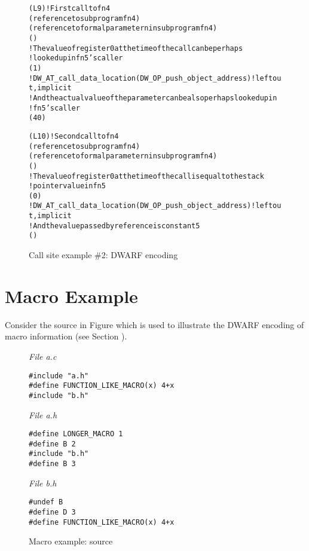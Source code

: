 \begin{figure}[ht]
\begin{dwflisting}
\begin{alltt}

\DWTAGcallsite
    \DWATcallreturnpc(L9)                       ! First call to fn4
    \DWATcallorigin(reference to subprogram fn4)
    \DWTAGcallsiteparameter
        \DWATcallparameter(reference to formal parameter n in subprogram fn4)
        \DWATlocation(\DWOPregzero)
        ! The value of register 0 at the time of the call can be perhaps 
        !   looked up in fn5's caller
        \DWATcallvalue(\DWOPentryvalue{} 1 \DWOPregzero)
        ! DW_AT_call_data_location(DW_OP_push_object_address) ! left out, implicit
        ! And the actual value of the parameter can be also perhaps looked up in
        ! fn5's caller
        \DWATcalldatavalue(\DWOPentryvalue{} 4 \DWOPbregzero{} 0 )
        
\DWTAGcallsite
    \DWATcallreturnpc(L10)                      ! Second call to fn4
    \DWATcallorigin(reference to subprogram fn4)
    \DWTAGcallsiteparameter
        \DWATcallparameter(reference to formal parameter n in subprogram fn4)
        \DWATlocation(\DWOPregzero)
        ! The value of register 0 at the time of the call is equal to the stack
        ! pointer value in fn5
        \DWATcallvalue(\DWOPbregthree{} 0)
        ! DW_AT_call_data_location(DW_OP_push_object_address) ! left out, implicit
        ! And the value passed by reference is constant 5
        \DWATcalldatavalue(\DWOPlitfive)
        
\end{alltt}
\end{dwflisting}
\caption{Call site example \#2: DWARF encoding}
\label{fig:callsiteexample2dwarf}
\end{figure}


\clearpage
\section{Macro Example}
\label{macroexample}
Consider the  source in Figure 
 which is used to illustrate the
DWARF encoding of macro information (see Section ).

\begin{figure}[ht]
\textit{File a.c}
\begin{lstlisting}
#include "a.h"
#define FUNCTION_LIKE_MACRO(x) 4+x
#include "b.h"
\end{lstlisting}
\vspace{7mm}
\textit{File a.h}
\begin{lstlisting}
#define LONGER_MACRO 1
#define B 2
#include "b.h"
#define B 3
\end{lstlisting}
\vspace{7mm}
\textit{File b.h}
\begin{lstlisting}
#undef B
#define D 3
#define FUNCTION_LIKE_MACRO(x) 4+x
\end{lstlisting}
\caption{Macro example: source}
\label{ref:macroexamplesource}
\end{figure}

